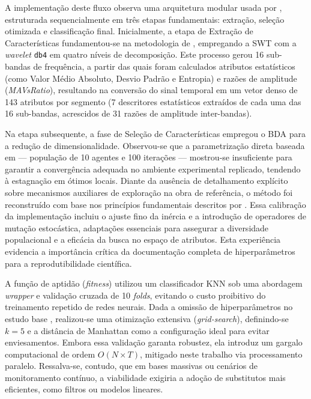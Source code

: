 \documentclass[alpha-refs,brazilian]{CC-EC_TF-TC}
\begin{document}
A implementação deste fluxo observa uma arquitetura modular usada por \cite{Yogarajan2023}, estruturada sequencialmente em três etapas fundamentais: extração, seleção otimizada e classificação final. Inicialmente, a etapa de Extração de Características fundamentou-se na metodologia de \cite{Yogarajan2023}, empregando a SWT com a \textit{wavelet} \texttt{db4} em quatro níveis de decomposição. Este processo gerou 16 sub-bandas de frequência, a partir das quais foram calculados atributos estatísticos (como Valor Médio Absoluto, Desvio Padrão e Entropia) e razões de amplitude (\textit{MAVsRatio}), resultando na conversão do sinal temporal em um vetor denso de 143 atributos por segmento (7 descritores estatísticos extraídos de cada uma das 16 sub-bandas, acrescidos de 31 razões 
de amplitude inter-bandas).

Na etapa subsequente, a fase de Seleção de Características empregou o BDA para a redução de dimensionalidade. Observou-se que a parametrização direta baseada em \cite{Yogarajan2023} — população de 10 agentes e 100 iterações — mostrou-se insuficiente para garantir a convergência adequada no ambiente experimental replicado, tendendo à estagnação em ótimos locais. Diante da ausência de detalhamento explícito sobre mecanismos auxiliares de exploração na obra de referência, o método foi reconstruído com base nos princípios fundamentais descritos por \cite{Mirjalili2016}. Essa calibração da implementação incluiu o ajuste fino da inércia e a introdução de operadores de mutação estocástica, adaptações essenciais para assegurar a diversidade populacional e a eficácia da busca no espaço de atributos. Esta experiência evidencia a importância crítica da documentação completa de hiperparâmetros para a reprodutibilidade científica.

A função de aptidão (\textit{fitness}) utilizou um classificador KNN sob uma abordagem \textit{wrapper} e validação cruzada de 10 \textit{folds}, evitando o custo proibitivo do treinamento repetido de redes neurais. Dada a omissão de hiperparâmetros no estudo base \citep{Yogarajan2023}, realizou-se uma otimização extensiva (\textit{grid-search}), definindo-se $k=5$ e a distância de Manhattan como a configuração ideal para evitar enviesamentos. Embora essa validação garanta robustez, ela introduz um gargalo computacional de ordem $O(N \times T)$, mitigado neste trabalho via processamento paralelo. Ressalva-se, contudo, que em bases massivas ou cenários de monitoramento contínuo, a viabilidade exigiria a adoção de substitutos mais eficientes, como filtros ou modelos lineares.
\end{document}
